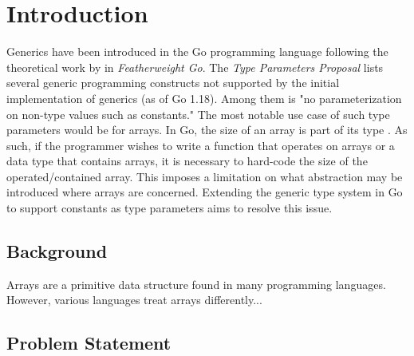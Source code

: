 \section{Introduction}

Generics have been introduced in the Go programming language following the
theoretical work by \cite{fg} in \emph{Featherweight Go}. The \emph{Type
Parameters Proposal} lists several generic programming constructs not supported
by the initial implementation of generics (as of Go 1.18). Among them is "no
parameterization on non-type values such as constants."
\autocite{genericsProposal} The most notable use case of such type parameters
would be for arrays. In Go, the size of an array is part of its type
\autocite{spec}. As such, if the programmer wishes to write a function that
operates on arrays or a data type that contains arrays, it is necessary to
hard-code the size of the operated/contained array. This imposes a limitation on
what abstraction may be introduced where arrays are concerned. Extending the
generic type system in Go to support constants as type parameters aims to
resolve this issue.

\subsection{Background}

Arrays are a primitive data structure found in many programming languages.
However, various languages treat arrays differently...



\subsection{Problem Statement}

